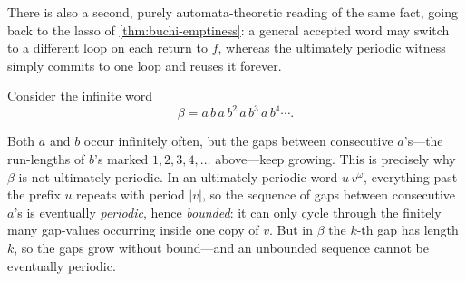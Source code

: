 There is also a second, purely automata-theoretic reading of the same
fact, going back to the lasso of \cref{thm:buchi-emptiness}: a general
accepted word may switch to a different loop on each return to $f$,
whereas the ultimately periodic witness simply commits to one loop and
reuses it forever.

\begin{example}
\label{ex:non-omega-regular-languages}
Consider the infinite word
\[
  \beta=a\,b\,a\,b^2\,a\,b^3\,a\,b^4\cdots .
\]

\begin{center}
\end{center}

Both $a$ and $b$ occur infinitely often, but the gaps between consecutive
$a$'s---the run-lengths of $b$'s marked $1,2,3,4,\dots$ above---keep
growing.  This is precisely why $\beta$ is not ultimately periodic.  In an
ultimately periodic word $u\,v^\omega$, everything past the prefix $u$
repeats with period $|v|$, so the sequence of gaps between consecutive
$a$'s is eventually \emph{periodic}, hence \emph{bounded}: it can only
cycle through the finitely many gap-values occurring inside one copy of
$v$.  But in $\beta$ the $k$-th gap has length $k$, so the gaps grow
without bound---and an unbounded sequence cannot be eventually periodic.


\end{example}
